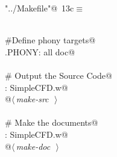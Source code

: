 \documentclass[a4paper,11pt]{article}
\begin{document}
\begin{flushleft} \small
\begin{minipage}{\linewidth}\label{scrap18}\raggedright\small
{} \verb@"../Makefile"@\nobreak\ {\footnotesize {13c}}$\equiv$
\vspace{-1ex}
\begin{list}{}{} \item
\mbox{}\verb@@\\
\mbox{}\verb@#Define phony targets@\\
\mbox{}\verb@.PHONY: all doc@\\
\mbox{}\verb@@\\
\mbox{}\verb@# Output the Source Code@\\
\mbox{}\verb@all: SimpleCFD.w@\\
\mbox{}\verb@        @\hbox{$\langle\,${\itshape make-src}\nobreak\ {\footnotesize {}}$\,\rangle$}\verb@@\\
\mbox{}\verb@@\\
\mbox{}\verb@# Make the documents@\\
\mbox{}\verb@doc: SimpleCFD.w@\\
\mbox{}\verb@        @\hbox{$\langle\,${\itshape make-doc}\nobreak\ {\footnotesize {}}$\,\rangle$}\verb@@\\
\mbox{}\verb@@{\NWsep}
\end{list}
\vspace{-1.5ex}
\footnotesize
\begin{list}{}{\setlength{\itemsep}{-\parsep}\setlength{\itemindent}{-\leftmargin}}

\item{}
\end{list}
\end{minipage}\vspace{4ex}
\end{flushleft}
\end{document}
